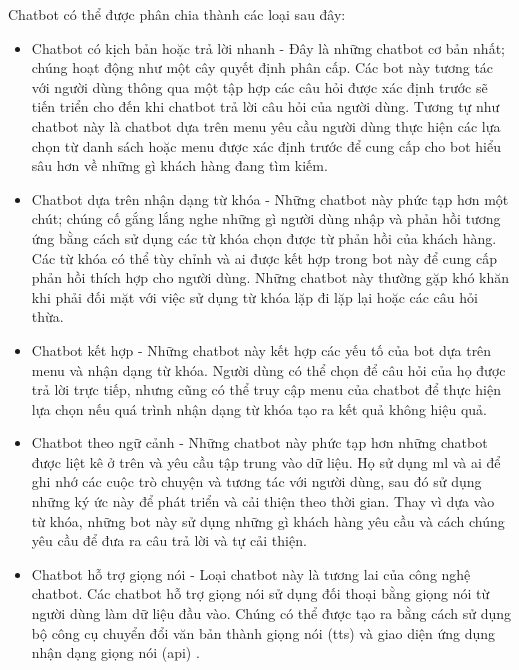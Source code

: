 Chatbot có thể được phân chia thành các loại sau đây:
\begin{itemize}
    \item Chatbot có kịch bản hoặc trả lời nhanh - Đây là những chatbot cơ bản nhất; chúng hoạt động như một cây quyết định phân cấp. Các bot này tương tác với người dùng thông qua một tập hợp các câu hỏi được xác định trước sẽ tiến triển cho đến khi chatbot trả lời câu hỏi của người dùng. Tương tự như chatbot này là chatbot dựa trên menu yêu cầu người dùng thực hiện các lựa chọn từ danh sách hoặc menu được xác định trước để cung cấp cho bot hiểu sâu hơn về những gì khách hàng đang tìm kiếm.

    \item Chatbot dựa trên nhận dạng từ khóa - Những chatbot này phức tạp hơn một chút; chúng cố gắng lắng nghe những gì người dùng nhập và phản hồi tương ứng bằng cách sử dụng các từ khóa chọn được từ phản hồi của khách hàng. Các từ khóa có thể tùy chỉnh và \ac{ai} được kết hợp trong bot này để cung cấp phản hồi thích hợp cho người dùng. Những chatbot này thường gặp khó khăn khi phải đối mặt với việc sử dụng từ khóa lặp đi lặp lại hoặc các câu hỏi thừa.

    \item Chatbot kết hợp - Những chatbot này kết hợp các yếu tố của bot dựa trên menu và nhận dạng từ khóa. Người dùng có thể chọn để câu hỏi của họ được trả lời trực tiếp, nhưng cũng có thể truy cập menu của chatbot để thực hiện lựa chọn nếu quá trình nhận dạng từ khóa tạo ra kết quả không hiệu quả.

    \item Chatbot theo ngữ cảnh - Những chatbot này phức tạp hơn những chatbot được liệt kê ở trên và yêu cầu tập trung vào dữ liệu. Họ sử dụng \ac{ml} và \ac{ai} để ghi nhớ các cuộc trò chuyện và tương tác với người dùng, sau đó sử dụng những ký ức này để phát triển và cải thiện theo thời gian. Thay vì dựa vào từ khóa, những bot này sử dụng những gì khách hàng yêu cầu và cách chúng yêu cầu để đưa ra câu trả lời và tự cải thiện.

    \item Chatbot hỗ trợ giọng nói - Loại chatbot này là tương lai của công nghệ chatbot. Các chatbot hỗ trợ giọng nói sử dụng đối thoại bằng giọng nói từ người dùng làm dữ liệu đầu vào. Chúng có thể được tạo ra bằng cách sử dụng bộ công cụ chuyển đổi văn bản thành giọng nói (\ac{tts}) và giao diện ứng dụng nhận dạng giọng nói (\ac{api}) \cite{chat-bot}.

\end{itemize}
